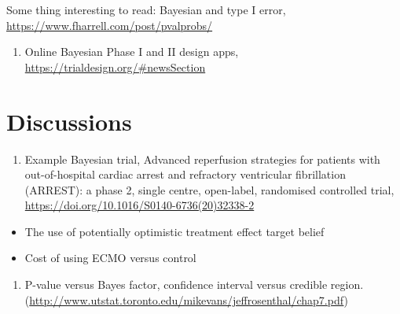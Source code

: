 \documentclass[
]{article}
\providecommand{\tightlist}{%
  \setlength{\itemsep}{0pt}\setlength{\parskip}{0pt}}
\begin{document}
Some thing interesting to read: Bayesian and type I error,
\url{https://www.fharrell.com/post/pvalprobs/}

\begin{enumerate}
\def\labelenumi{\arabic{enumi}.}
\setcounter{enumi}{4}
\tightlist
\item
  Online Bayesian Phase I and II design apps,
  \url{https://trialdesign.org/\#newsSection}
\end{enumerate}

\hypertarget{discussions}{%
\section{Discussions}\label{discussions}}

\begin{enumerate}
\def\labelenumi{\arabic{enumi}.}
\tightlist
\item
  Example Bayesian trial, Advanced reperfusion strategies for patients
  with out-of-hospital cardiac arrest and refractory ventricular
  fibrillation (ARREST): a phase 2, single centre, open-label,
  randomised controlled trial,
  \url{https://doi.org/10.1016/S0140-6736(20)32338-2}
\end{enumerate}

\begin{itemize}
\tightlist
\item
  The use of potentially optimistic treatment effect target belief
\item
  Cost of using ECMO versus control
\end{itemize}

\begin{enumerate}
\def\labelenumi{\arabic{enumi}.}
\setcounter{enumi}{1}
\tightlist
\item
  P-value versus Bayes factor, confidence interval versus credible
  region.
  (\url{http://www.utstat.toronto.edu/mikevans/jeffrosenthal/chap7.pdf})
\end{enumerate}
\end{document}

